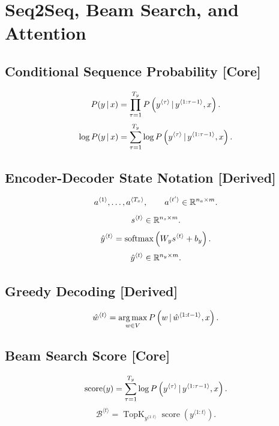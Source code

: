 \section{Seq2Seq, Beam Search, and Attention}

\subsection{Conditional Sequence Probability \textbf{[Core]}}

\[
P(y \,|\, x)
=
\prod_{\tau=1}^{T_y}
P
\left(
y^{\langle \tau\rangle}
\,|\,
y^{\langle 1:\tau-1\rangle},
x
\right).
\]
\[
\log P(y \,|\, x)
=
\sum_{\tau=1}^{T_y}
\log
P
\left(
y^{\langle \tau\rangle}
\,|\,
y^{\langle 1:\tau-1\rangle},
x
\right).
\]

\subsection{Encoder-Decoder State Notation \textbf{[Derived]}}

\[
a^{\langle 1\rangle},\dots,a^{\langle T_x\rangle},
\qquad
a^{\langle t'\rangle}
\in
\mathbb{R}^{n_a \times m}.
\]
\[
s^{\langle t\rangle}
\in
\mathbb{R}^{n_s \times m}.
\]
\[
\hat{y}^{\langle t\rangle}
=
\operatorname{softmax}
\left(
W_y s^{\langle t\rangle}
+
b_y
\right).
\]
\[
\hat{y}^{\langle t\rangle}
\in
\mathbb{R}^{n_y \times m}.
\]

\subsection{Greedy Decoding \textbf{[Derived]}}

\[
\hat{w}^{\langle t\rangle}
=
\operatorname*{arg\,max}_{w \in V}
P
\left(
w
\,|\,
\hat{w}^{\langle 1:t-1\rangle},
x
\right).
\]

\subsection{Beam Search Score \textbf{[Core]}}

\[
\operatorname{score}(y)
=
\sum_{\tau=1}^{T_y}
\log
P
\left(
y^{\langle \tau\rangle}
\,|\,
y^{\langle 1:\tau-1\rangle},
x
\right).
\]
\[
\mathcal{B}^{\langle t\rangle}
=
\operatorname{TopK}_{y^{\langle 1:t\rangle}}
\operatorname{score}
\left(
y^{\langle 1:t\rangle}
\right).
\]

